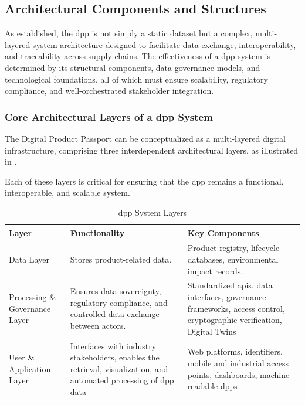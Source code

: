 \subsection{Architectural Components and Structures}

As established, the \acrlong{dpp} is not simply a static dataset but a complex, multi-layered system architecture designed to facilitate data exchange, interoperability, and traceability across supply chains. The effectiveness of a \ac{dpp} system is determined by its structural components, data governance models, and technological foundations, all of which must ensure scalability, regulatory compliance, and well-orchestrated stakeholder integration. \autocite{Nowacki.2023}

\subsubsection*{Core Architectural Layers of a \ac{dpp} System}
The Digital Product Passport can be conceptualized as a multi-layered digital infrastructure, comprising three interdependent architectural layers, as illustrated in .

Each of these layers is critical for ensuring that the \ac{dpp} remains a functional, interoperable, and scalable system.

\begin{table}[H]
    \centering
    \caption{\ac{dpp} System Layers}
    \begin{tabularx}{\textwidth}{|>{\centering\arraybackslash}X|>{\centering\arraybackslash}X|>{\centering\arraybackslash}X|}
        \hline
        \rowcolor{myDarkBlue}\color{white}\textbf{Layer} & \color{white}\textbf{Functionality} & \color{white}\textbf{Key Components} \\
        \hline
        \rowcolor{lightgray!25}Data Layer & Stores product-related data. & Product registry, lifecycle databases, environmental impact records. \autocite{Wan.2025, EuropeanParliamentandCouncil.2024} \\
        \hline
        \rowcolor{myGrey} Processing \& Governance Layer & Ensures data sovereignty, regulatory compliance, and controlled data exchange between actors. & Standardized \ac{api}s, data interfaces, governance frameworks, access control, cryptographic verification, Digital Twins \autocite{Ajdinovic.2024} \\
        \hline
        \rowcolor{lightgray!25}User \& Application Layer & Interfaces with industry stakeholders, enables the retrieval, visualization, and automated processing of \ac{dpp} data & Web platforms, identifiers, mobile and industrial access points, dashboards, machine-readable \ac{dpp}s \autocite{EuropeanParliamentandCouncil.2024} \\
        \hline
    \end{tabularx}
    \label{tab:dpp_system_layers}
\end{table}

